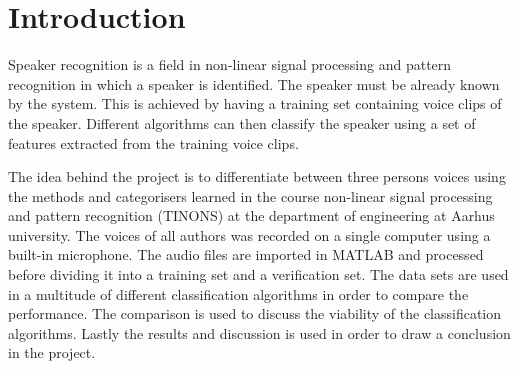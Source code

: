 \section{Introduction}
Speaker recognition is a field in non-linear signal processing and pattern recognition in which a speaker is identified. The speaker must be already known by the system. This is achieved by having a training set containing voice clips of the speaker. Different algorithms can then classify the speaker using a set of features extracted from the training voice clips.

The idea behind the project is to differentiate between three persons voices using the methods and categorisers learned in the course non-linear signal processing and pattern recognition (TINONS) at the department of engineering at Aarhus university. 
The voices of all authors was recorded on a single computer using a built-in microphone. The audio files are imported in MATLAB and processed before dividing it into a training set and a verification set.
The data sets are used in a multitude of different classification algorithms in order to compare the performance. The comparison is used to discuss the viability of the classification algorithms. Lastly the results and discussion is used in order to draw a conclusion in the project.

